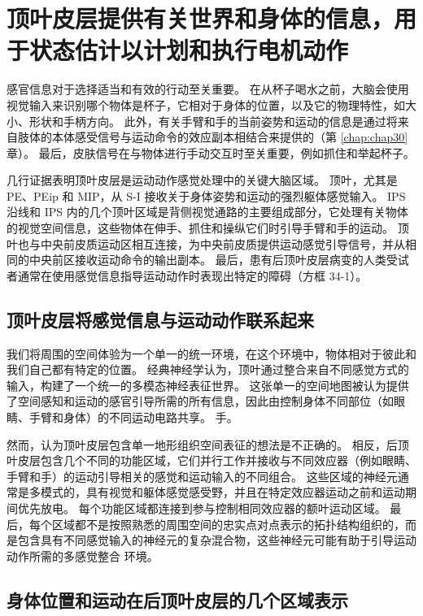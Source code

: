\section{顶叶皮层提供有关世界和身体的信息，用于状态估计以计划和执行电机动作}

感官信息对于选择适当和有效的行动至关重要。
在从杯子喝水之前，大脑会使用视觉输入来识别哪个物体是杯子，它相对于身体的位置，以及它的物理特性，如大小、形状和手柄方向。
此外，有关手臂和手的当前姿势和运动的信息是通过将来自肢体的本体感受信号与运动命令的效应副本相结合来提供的（第 \ref{chap:chap30} 章）。
最后，皮肤信号在与物体进行手动交互时至关重要，例如抓住和举起杯子。


几行证据表明顶叶皮层是运动动作感觉处理中的关键大脑区域。
顶叶，尤其是 PE、PEip 和 MIP，从 S-I 接收关于身体姿势和运动的强烈躯体感觉输入。
IPS 沿线和 IPS 内的几个顶叶区域是背侧视觉通路的主要组成部分，它处理有关物体的视觉空间信息，这些物体在伸手、抓住和操纵它们时引导手臂和手的运动。
顶叶也与中央前皮质运动区相互连接，为中央前皮质提供运动感觉引导信号，并从相同的中央前区接收运动命令的输出副本。
最后，患有后顶叶皮层病变的人类受试者通常在使用感觉信息指导运动动作时表现出特定的障碍（方框 34-1）。



\subsection{顶叶皮层将感觉信息与运动动作联系起来}

我们将周围的空间体验为一个单一的统一环境，在这个环境中，物体相对于彼此和我们自己都有特定的位置。
经典神经学认为，顶叶通过整合来自不同感觉方式的输入，构建了一个统一的多模态神经表征世界。
这张单一的空间地图被认为提供了空间感知和运动的感官引导所需的所有信息，因此由控制身体不同部位（如眼睛、手臂和身体）的不同运动电路共享。 手。


然而，认为顶叶皮层包含单一地形组织空间表征的想法是不正确的。
相反，后顶叶皮层包含几个不同的功能区域，它们并行工作并接收与不同效应器（例如眼睛、手臂和手）的运动引导相关的感觉和运动输入的不同组合。
这些区域的神经元通常是多模式的，具有视觉和躯体感觉感受野，并且在特定效应器运动之前和运动期间优先放电。
每个功能区域都连接到参与控制相同效应器的额叶运动区域。
最后，每个区域都不是按照熟悉的周围空间的忠实点对点表示的拓扑结构组织的，而是包含具有不同感觉输入的神经元的复杂混合物，这些神经元可能有助于引导运动动作所需的多感觉整合 环境。



\subsection{身体位置和运动在后顶叶皮层的几个区域表示}

